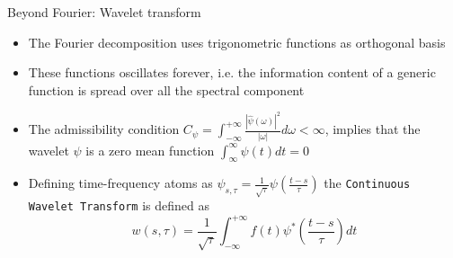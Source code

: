 \documentclass[t,10pt]{beamer}
\begin{document}
\begin{frame}{Beyond Fourier: Wavelet transform}
\begin{itemize}[<+->]
\item The Fourier decomposition uses trigonometric functions as
  orthogonal basis
\item These functions oscillates forever,
  i.e. the information content of a generic function is spread over
  all the spectral component

\item The admissibility condition
  $C_{\psi}=\int_{-\infty}^{+\infty}\frac{|\hat{\psi}(\omega)|^2}{|\omega|}d\omega
  < \infty$, implies that the wavelet $\psi$ is a zero mean function
  $\int_{\infty}^{\infty}\psi(t)dt =0$
\item Defining time-frequency atoms as
  $\psi_{s,\tau}=\frac{1}{\sqrt{\tau}}\psi\left(\frac{t-s}{\tau}\right)$ the
  \textcolor{tachameleon}{\texttt{Continuous Wavelet Transform}} is
  defined as 
\begin{equation*}
w(s,\tau)=\frac{1}{\sqrt{\tau}}\int_{-\infty}^{+\infty}f(t)\psi^{*}\left(\frac{t-s}{\tau}\right)dt
\end{equation*}
\end{itemize}
\end{frame}
\end{document}
